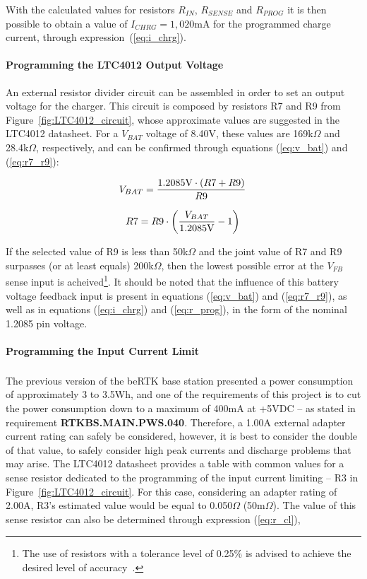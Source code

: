 With the calculated values for resistors $R_{IN}$, $R_{SENSE}$ and $R_{PROG}$ it is then possible to obtain a value of $I_{CHRG} = 1,020$mA for the programmed charge current, through expression~(\ref{eq:i_chrg}).

\paragraph{Programming the LTC4012 Output Voltage}	An external resistor divider circuit can be assembled in order to set an output voltage for the charger. This circuit is composed by resistors R7 and R9 from Figure~\ref{fig:LTC4012_circuit}, whose approximate values are suggested in the LTC4012 datasheet. For a $V_{BAT}$ voltage of 8.40V, these values are 169k$\Omega$ and 28.4k$\Omega$, respectively, and can be confirmed through equations (\ref{eq:v_bat}) and (\ref{eq:r7_r9}):

\begin{equation}\label{eq:v_bat}
    V_{BAT}=\frac{1.2085\textrm{V} \cdot \left(R7 + R9\right)}{R9}\,\medskip
\end{equation}

\begin{equation}\label{eq:r7_r9}
    R7=R9 \cdot \left(\frac{V_{BAT}}{1.2085\textrm{V}} - 1\right)\,\medskip
\end{equation}

If the selected value of R9 is less than 50k$\Omega$ and the joint value of R7 and R9 surpasses (or at least equals) 200k$\Omega$, then the lowest possible error at the $V_{FB}$ sense input is acheived\footnote[10]{The use of resistors with a tolerance level of 0.25\% is advised to achieve the desired level of accuracy~\cite{LTC4012}.}. It should be noted that the influence of this battery voltage feedback input is present in equations (\ref{eq:v_bat}) and (\ref{eq:r7_r9}), as well as in equations (\ref{eq:i_chrg}) and (\ref{eq:r_prog}), in the form of the nominal 1.2085 pin voltage.

\paragraph{Programming the Input Current Limit}	The previous version of the beRTK\textsuperscript{\textregistered} base station presented a power consumption of approximately 3 to 3.5Wh, and one of the requirements of this project is to cut the power consumption down to a maximum of 400mA at +5VDC -- as stated in requirement \textbf{RTKBS.MAIN.PWS.040}. Therefore, a 1.00A external adapter current rating can safely be considered, however, it is best to consider the double of that value, to safely consider high peak currents and discharge problems that may arise.
The LTC4012 datasheet provides a table with common values for a sense resistor dedicated to the programming of the input current limiting -- R3 in Figure~\ref{fig:LTC4012_circuit}. For this case, considering an adapter rating of 2.00A, R3's estimated value would be equal to 0.050$\Omega$ (50m$\Omega$). The value of this sense resistor can also be determined through expression (\ref{eq:r_cl}),


